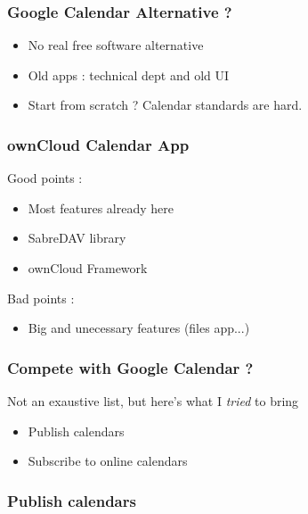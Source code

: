 \documentclass[11pt]{beamer}
\begin{document}
	\begin{frame}
		\frametitle{Google Calendar Alternative ?}
		\begin{itemize}
			\item No real free software alternative
			\item Old apps : technical dept and old UI
			\item Start from scratch ? Calendar standards are hard.
			\end{itemize}
	\end{frame}
	\begin{frame}
		\frametitle{ownCloud Calendar App}
		Good points :
		\begin{itemize}
			\item Most features already here
			\item SabreDAV library
			\item ownCloud Framework
		\end{itemize}
		Bad points :
		\begin{itemize}
			\item Big and unecessary features (files app...)
		\end{itemize}
	\end{frame}
	\begin{frame}
		\frametitle{Compete with Google Calendar ?}
		Not an exaustive list, but here's what I \textit{tried} to bring
		\begin{itemize}
			\item Publish calendars
			\item Subscribe to online calendars
		\end{itemize}
	\end{frame}
	\begin{frame}
		\frametitle{Publish calendars}
	\end{frame}
\end{document}

